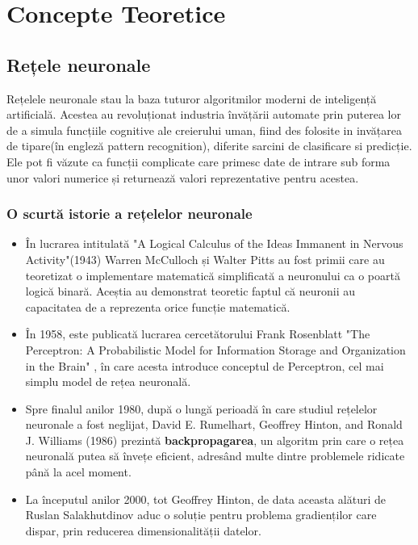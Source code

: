 \chapter{Concepte Teoretice}

\section{Rețele neuronale}

Rețelele neuronale stau la baza tuturor algoritmilor moderni de inteligență artificială. Acestea au revoluționat industria învățării automate prin puterea lor de a simula funcțiile cognitive ale creierului uman, fiind des folosite in invățarea de tipare(în engleză pattern recognition), diferite sarcini de clasificare si predicție. Ele pot fi văzute ca funcții complicate care primesc date de intrare sub forma unor valori numerice și returnează valori reprezentative pentru acestea. 

\subsection{O scurtă istorie a rețelelor neuronale}

\begin{itemize}
    \item În lucrarea intitulată "A Logical Calculus of the Ideas Immanent in Nervous Activity"(1943) \cite{mcculloch1943logical} Warren McCulloch și Walter Pitts au fost primii care au teoretizat o implementare matematică simplificată a neuronului ca o poartă logică binară. Aceștia au demonstrat teoretic faptul că neuronii au capacitatea de a reprezenta orice funcție matematică.

    \item În 1958, este publicată lucrarea cercetătorului Frank Rosenblatt "The Perceptron: A Probabilistic Model for Information Storage and Organization in the Brain" \cite{rosenblatt1958perceptron}, în care acesta introduce conceptul de Perceptron, cel mai simplu model de rețea neuronală. 

    \newpage
    
    \item Spre finalul anilor 1980, după o lungă perioadă în care studiul rețelelor neuronale a fost neglijat, David E. Rumelhart, Geoffrey Hinton, and Ronald J. Williams (1986) \cite{rumelhart1986learning} prezintă \textbf{backpropagarea}, un algoritm prin care o rețea neuronală putea să învețe eficient, adresând multe dintre problemele ridicate până la acel moment. 

    \item La începutul anilor 2000, tot Geoffrey Hinton, de data aceasta alături de Ruslan Salakhutdinov \cite{hinton2006reducing} aduc o soluție pentru problema gradienților care dispar, prin reducerea dimensionalității datelor.
\end{itemize}

